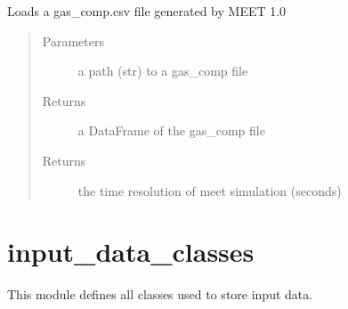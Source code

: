 \documentclass[letterpaper,10pt,english]{sphinxmanual}
\begin{document}
\begin{fulllineitems}
\label{\detokenize{index:feast.MEET_1_importer.load_gas_comp_file}}
Loads a gas\_comp.csv file generated by MEET 1.0
\begin{quote}\begin{description}
\item[{Parameters}] \leavevmode
{} \textendash{} a path (str) to a gas\_comp file

\item[{Returns}] \leavevmode
a DataFrame of the gas\_comp file

\item[{Returns}] \leavevmode
the time resolution of meet simulation (seconds)

\end{description}\end{quote}

\end{fulllineitems}



\section{input\_data\_classes}
\label{\detokenize{index:module-feast.input_data_classes}}\label{\detokenize{index:input-data-classes}}
This module defines all classes used to store input data.
\end{document}
